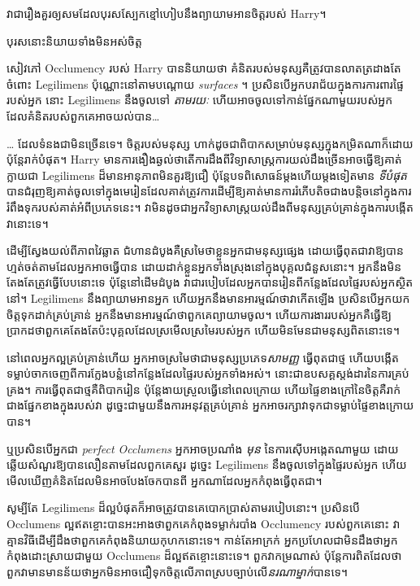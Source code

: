 {វា​ជា​រឿង​គួរ​ឲ្យ​សម​ដែល​បុរស​ស្បែក​ខ្មៅ​ហៀបនឹង​ព្យាយាម​អាន​ចិត្ត​របស់ Harry។

បុរស​នោះ​និយាយ​ទាំង​មិន​អស់ចិត្ត

សៀវភៅ Occlumency របស់ Harry បាននិយាយថា គំនិតរបស់មនុស្សគឺត្រូវបានលាតត្រដាងតែចំពោះ Legilimens ប៉ុណ្ណោះនៅតាមបណ្តោយ \emph{surfaces} ។ ប្រសិនបើអ្នកបរាជ័យក្នុងការការពារផ្ទៃរបស់អ្នក នោះ Legilimens នឹងចូលទៅ \emph{តាមរយៈ} ហើយអាចចូលទៅកាន់ផ្នែកណាមួយរបស់អ្នក ដែលគំនិតរបស់ពួកគេអាចយល់បាន…

… ដែលទំនងជាមិនច្រើនទេ។ ចិត្តរបស់មនុស្ស ហាក់ដូចជាពិបាកសម្រាប់មនុស្សក្នុងកម្រិតណាក៏ដោយ ប៉ុន្តែរាក់បំផុត។ Harry មានការងឿងឆ្ងល់ថាតើការដឹងពីវិទ្យាសាស្ត្រការយល់ដឹងច្រើនអាចធ្វើឱ្យគាត់ក្លាយជា Legilimens ដ៏មានអានុភាពមិនគួរឱ្យជឿ ប៉ុន្តែបទពិសោធន៍ម្តងហើយម្តងទៀតមាន \emph{ទីបំផុត} បានជំរុញឱ្យគាត់ចូលទៅក្នុងមេរៀនដែលគាត់ត្រូវការដើម្បីឱ្យគាត់មានការរំភើបតិចជាងបន្តិចនៅក្នុងការរំពឹងទុករបស់គាត់អំពីប្រភេទនេះ។ វា​មិន​ដូច​ជា​អ្នក​វិទ្យាសាស្ត្រ​យល់​ដឹង​ពី​មនុស្ស​គ្រប់​គ្រាន់​ក្នុង​ការ​បង្កើត​វា​នោះ​ទេ។

ដើម្បីស្វែងយល់ពីភាពវៃឆ្លាត ជំហានដំបូងគឺស្រមៃថាខ្លួនអ្នកជាមនុស្សផ្សេង ដោយធ្វើពុតជាវាឱ្យបានហ្មត់ចត់តាមដែលអ្នកអាចធ្វើបាន ដោយដាក់ខ្លួនអ្នកទាំងស្រុងនៅក្នុងបុគ្គលជំនួសនោះ។ អ្នក​នឹង​មិន​តែងតែ​ត្រូវ​ធ្វើ​បែប​នោះ​ទេ ប៉ុន្តែ​នៅ​ដើម​ដំបូង វា​ជា​របៀប​ដែល​អ្នក​បាន​រៀន​ពី​កន្លែង​ដែល​ផ្ទៃ​របស់​អ្នក​ស្ថិត​នៅ។ Legilimens នឹងព្យាយាមអានអ្នក ហើយអ្នកនឹងមានអារម្មណ៍ថាវាកើតឡើង ប្រសិនបើអ្នកយកចិត្តទុកដាក់គ្រប់គ្រាន់ អ្នកនឹងមានអារម្មណ៍ថាពួកគេព្យាយាមចូល។ ហើយការងាររបស់អ្នកគឺធ្វើឱ្យប្រាកដថាពួកគេតែងតែប៉ះបុគ្គលដែលស្រមើលស្រមៃរបស់អ្នក ហើយមិនមែនជាមនុស្សពិតនោះទេ។

នៅពេលអ្នកល្អគ្រប់គ្រាន់ហើយ អ្នកអាចស្រមៃថាជាមនុស្សប្រភេទ\emph{សាមញ្ញ} ធ្វើពុតជាថ្ម ហើយបង្កើតទម្លាប់ចាកចេញពីការក្លែងបន្លំនៅកន្លែងដែលផ្ទៃរបស់អ្នកទាំងអស់។ នោះ​ជា​ឧបសគ្គ​ស្តង់ដារ​នៃ​ការ​គ្រប់គ្រង។ ការធ្វើពុតជាថ្មគឺពិបាករៀន ប៉ុន្តែងាយស្រួលធ្វើនៅពេលក្រោយ ហើយផ្ទៃខាងក្រៅនៃចិត្តគឺរាក់ជាងផ្នែកខាងក្នុងរបស់វា ដូច្នេះជាមួយនឹងការអនុវត្តគ្រប់គ្រាន់ អ្នកអាចរក្សាវាទុកជាទម្លាប់ផ្ទៃខាងក្រោយបាន។

ឬប្រសិនបើអ្នកជា \emph{perfect Occlumens} អ្នកអាចប្រណាំង \emph{មុន} នៃការស៊ើបអង្កេតណាមួយ ដោយឆ្លើយសំណួរឱ្យបានលឿនតាមដែលពួកគេសួរ ដូច្នេះ Legilimens នឹងចូលទៅក្នុងផ្ទៃរបស់អ្នក ហើយមើលឃើញគំនិតដែលមិនអាចបែងចែកបានពី អ្នកណាដែលអ្នកកំពុងធ្វើពុតជា។

សូម្បីតែ Legilimens ដ៏ល្អបំផុតក៏អាចត្រូវបានគេបោកប្រាស់តាមរបៀបនោះ។ ប្រសិនបើ Occlumens ល្អឥតខ្ចោះបានអះអាងថាពួកគេកំពុងទម្លាក់របាំង Occlumency របស់ពួកគេនោះ វាគ្មានវិធីដើម្បីដឹងថាពួកគេកំពុងនិយាយកុហកនោះទេ។ កាន់តែអាក្រក់ អ្នកប្រហែលជាមិនដឹងថាអ្នកកំពុងដោះស្រាយជាមួយ Occlumens ដ៏ល្អឥតខ្ចោះនោះទេ។ ពួកវាកម្រណាស់ ប៉ុន្តែការពិតដែលថាពួកវាមានមានន័យថាអ្នកមិនអាចជឿទុកចិត្តលើភាពស្របច្បាប់លើ\emph{នរណាម្នាក់}បានទេ។

}
